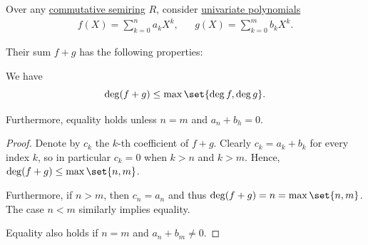 \begin{proposition}\label{thm:univariate_polynomial_sum}
  Over any \hyperref[def:semiring/commutative]{commutative semiring} \( R \), consider \hyperref[def:univariate_polynomial]{univariate polynomials}
  \begin{align*}
    f(X) = \sum_{k=0}^n a_k X^k, &&
    g(X) = \sum_{k=0}^m b_k X^k.
  \end{align*}

  Their sum \( f + g \) has the following properties:
  \begin{thmenum}
     We have
    \begin{equation}\label{eq:thm:univariate_polynomial_sum/degree}
      \deg(f + g) \leq \max\set{ \deg f, \deg g }.
    \end{equation}

    Furthermore, equality holds unless \( n = m \) and \( a_n + b_h = 0 \).
  \end{thmenum}
\end{proposition}
\begin{proof}
   Denote by \( c_k \) the \( k \)-th coefficient of \( f + g \). Clearly \( c_k = a_k + b_k \) for every index \( k \), so in particular \( c_k = 0 \) when \( k > n \) and \( k > m \). Hence, \( \deg(f + g) \leq \max\set{ n, m } \).

  Furthermore, if \( n > m \), then \( c_n = a_n \) and thus \( \deg(f + g) = n = \max\set{ n, m } \). The case \( n < m \) similarly implies equality.

  Equality also holds if \( n = m \) and \( a_n + b_m \neq 0 \).
\end{proof}

